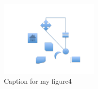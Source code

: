 \begin{figure}[h]
\centering 
\includegraphics[height=1.5in]{./pics/trim}
\caption{Caption for my figure4}
\label{fig:MyFigure4}
\end{figure}














